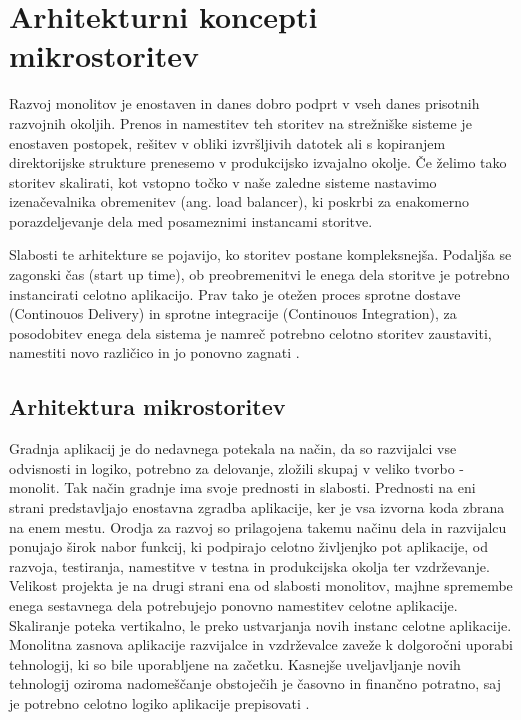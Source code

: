 \documentclass[a4paper, 12pt]{book}
\begin{document}
\chapter{Arhitekturni koncepti mikrostoritev}
\label{ch1}

Razvoj monolitov je enostaven in danes dobro podprt v vseh danes prisotnih razvojnih okoljih.
Prenos in namestitev teh storitev na strežniške sisteme je enostaven postopek, rešitev v obliki izvršljivih datotek ali s kopiranjem direktorijske strukture prenesemo v produkcijsko izvajalno okolje.
Če želimo tako storitev skalirati, kot vstopno točko v naše zaledne sisteme nastavimo izenačevalnika obremenitev (ang. load balancer), ki poskrbi za enakomerno porazdeljevanje dela med posameznimi instancami storitve.

Slabosti te arhitekture se pojavijo, ko storitev postane kompleksnejša.
Podaljša se zagonski čas (start up time), ob preobremenitvi le enega dela storitve je potrebno instancirati celotno aplikacijo.
Prav tako je otežen proces sprotne dostave (Continouos Delivery) in sprotne integracije (Continouos Integration), za posodobitev enega dela sistema je namreč potrebno celotno storitev zaustaviti, namestiti novo različico in jo ponovno zagnati \cite{monolithMicroservice}.


\section{Arhitektura mikrostoritev}

Gradnja aplikacij je do nedavnega potekala na način, da so razvijalci vse odvisnosti in logiko, potrebno za delovanje, zložili skupaj v veliko tvorbo - monolit.
Tak način gradnje ima svoje prednosti in slabosti.
Prednosti na eni strani predstavljajo enostavna zgradba aplikacije, ker je vsa izvorna koda zbrana na enem mestu.
Orodja za razvoj so prilagojena takemu načinu dela in razvijalcu ponujajo širok nabor funkcij, ki podpirajo celotno življenjko pot aplikacije, od razvoja, testiranja, namestitve v testna in produkcijska okolja ter vzdrževanje.
Velikost projekta je na drugi strani ena od slabosti monolitov, majhne spremembe enega sestavnega dela potrebujejo ponovno namestitev celotne aplikacije.
Skaliranje poteka vertikalno, le preko ustvarjanja novih instanc celotne aplikacije.
Monolitna zasnova aplikacije razvijalce in vzdrževalce zaveže k dolgoročni uporabi tehnologij, ki so bile uporabljene na začetku.
Kasnejše uveljavljanje novih tehnologij oziroma nadomeščanje obstoječih je časovno in finančno potratno, saj je potrebno celotno logiko aplikacije prepisovati \cite{monolithMicroservice}.
\end{document}
